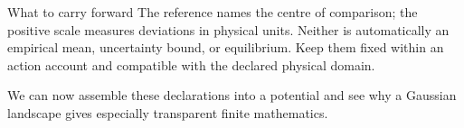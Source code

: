 \begin{intuitionbox}{What to carry forward}
The reference names the centre of comparison; the positive scale measures deviations in physical units. Neither is automatically an empirical mean, uncertainty bound, or equilibrium. Keep them fixed within an action account and compatible with the declared physical domain.
\end{intuitionbox}

We can now assemble these declarations into a potential and see why a Gaussian landscape gives especially transparent finite mathematics.
